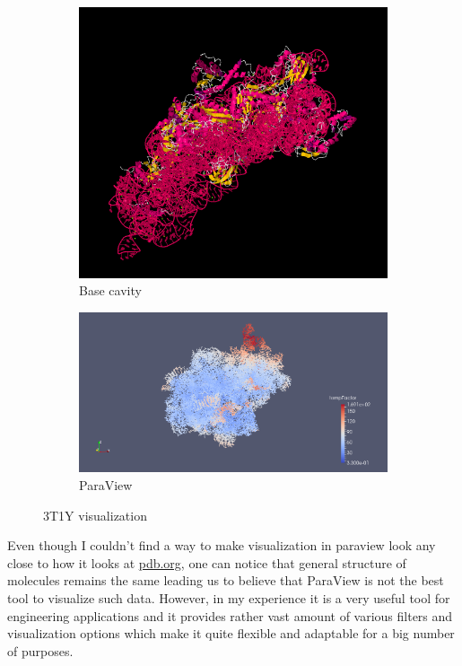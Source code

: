 \documentclass{article}
\begin{document}
\begin{figure}
	\centering
	\begin{subfigure}[h]{0.3\textwidth}
		\includegraphics[width=\textwidth]{pdb-3t1y.png}
		\caption{Base cavity}
		\label{fig:pdb2}
	\end{subfigure}
	\begin{subfigure}[h]{0.5\textwidth}
		\includegraphics[width=\textwidth]{3t1y.png}
		\caption{ParaView}
		\label{fig:pv2}
	\end{subfigure}
	\caption{3T1Y visualization}\label{fig:10}
\end{figure}

Even though I couldn't find a way to make visualization in paraview look any close to how it looks at \url{pdb.org}, one can notice that general structure of molecules remains the same leading us to believe that ParaView is not the best tool to visualize such data. However, in my experience it is a very useful tool for engineering applications and it provides rather vast amount of various filters and visualization options which make it quite flexible and adaptable for a big number of purposes.


\end{document}
